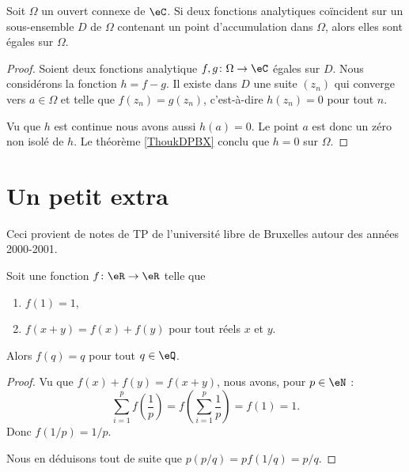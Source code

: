 \begin{theorem}\label{ThoAVBCewB}
	Soit \( \Omega\) un ouvert connexe de \( \eC\). Si deux fonctions analytiques coïncident sur un sous-ensemble \( D\) de \( \Omega\) contenant un point d'accumulation dans \( \Omega\), alors elles sont égales sur \( \Omega\).
\end{theorem}

\begin{proof}
	Soient deux fonctions analytique \( f,g\colon \Omega\to \eC\) égales sur \( D\). Nous considérons la fonction \( h=f-g\). Il existe dans \( D\) une suite \( (z_n)\) qui converge vers \( a\in \Omega\) et telle que \( f(z_n)=g(z_n)\), c'est-à-dire \( h(z_n)=0\) pour tout \( n\).

	Vu que \( h\) est continue nous avons aussi \( h(a)=0\). Le point \( a\) est donc un zéro non isolé de \( h\). Le théorème \ref{ThoukDPBX} conclu que \( h=0\) sur \( \Omega\).
\end{proof}

\section{Un petit extra}

Ceci provient de notes de TP de l'université libre de Bruxelles autour des années 2000-2001\cite{BIBooFYVSooNIiApF}. 

\begin{lemma}        \label{LEMooXRMAooRADhOM}
    Soit une fonction \( f\colon \eR\to \eR\) telle que
    \begin{enumerate}

        \item		\label{ItemExtrai}
            \( f(1)=1\),

        \item		\label{ItemExtraii}
            \( f(x+y)=f(x)+f(y)\) pour tout réels \( x\) et \( y\).
    \end{enumerate}
    Alors \( f(q)=q\) pour tout \( q\in \eQ\).
\end{lemma}

\begin{proof}
    Vu que \( f(x)+f(y)=f(x+y)\), nous avons, pour \( p\in \eN\) :
    \begin{equation}
        \sum_{i=1}^pf(\frac{1}{ p })=f(\sum_{i=1}^p\frac{1}{ p })=f(1)=1.
    \end{equation}
    Donc \( f(1/p)=1/p\).

    Nous en déduisons tout de suite que \( p(p/q)=pf(1/q)=p/q\).
\end{proof}


